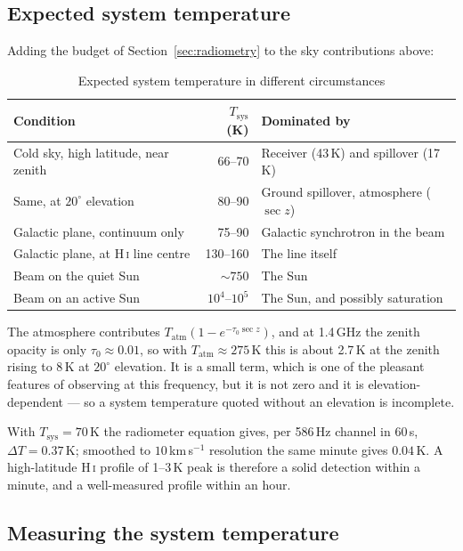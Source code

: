 \documentclass[11pt,a4paper]{article}
\begin{document}
\subsection{Expected system temperature}

Adding the budget of Section~\ref{sec:radiometry} to the sky contributions above:

\begin{table}[H]
\centering
\caption{Expected system temperature in different circumstances}
\label{tab:tsysexpected}
\small
\begin{tabular}{lrl}
\toprule
\textbf{Condition} & \textbf{$T_\text{sys}$ (K)} & \textbf{Dominated by} \\
\midrule
Cold sky, high latitude, near zenith & 66--70 & Receiver (43\,K) and spillover (17\,K) \\
Same, at $20^\circ$ elevation & 80--90 & Ground spillover, atmosphere ($\sec z$) \\
Galactic plane, continuum only & 75--90 & Galactic synchrotron in the beam \\
Galactic plane, at H\,\textsc{i} line centre & 130--160 & The line itself \\
Beam on the quiet Sun & $\sim750$ & The Sun \\
Beam on an active Sun & $10^4$--$10^5$ & The Sun, and possibly saturation \\
\bottomrule
\end{tabular}
\end{table}

The atmosphere contributes $T_\text{atm}(1 - e^{-\tau_0 \sec z})$, and at 1.4\,GHz the zenith opacity is only $\tau_0 \approx 0.01$, so with $T_\text{atm} \approx 275$\,K this is about 2.7\,K at the zenith rising to 8\,K at $20^\circ$ elevation. It is a small term, which is one of the pleasant features of observing at this frequency, but it is not zero and it is elevation-dependent --- so a system temperature quoted without an elevation is incomplete.

With $T_\text{sys} = 70$\,K the radiometer equation gives, per 586\,Hz channel in 60\,s, $\Delta T = 0.37$\,K; smoothed to $10$\,km\,s$^{-1}$ resolution the same minute gives $0.04$\,K. A high-latitude H\,\textsc{i} profile of 1--3\,K peak is therefore a solid detection within a minute, and a well-measured profile within an hour.

\subsection{Measuring the system temperature}
\label{sec:tsysmeasure}
\end{document}
